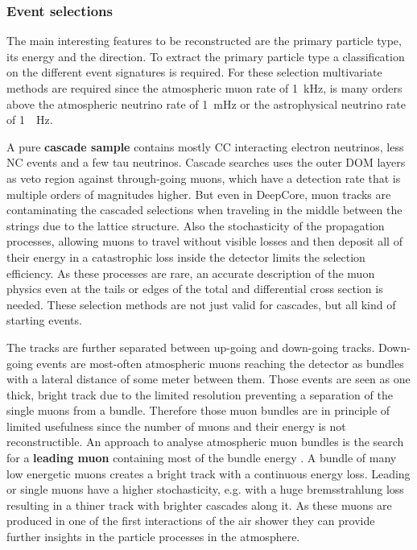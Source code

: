 \subsubsection{Event selections}

The main interesting features to be reconstructed are the primary particle type, its energy and the direction.
To extract the primary particle type a classification on the different event signatures is required.
For these selection multivariate methods are required since the atmospheric muon rate of \SI{1}{kHz}, is many orders above the atmospheric neutrino rate of \SI{1}{mHz} or the astrophysical neutrino rate of \SI{1}{\micro.Hz}.

A pure \textbf{cascade sample} contains mostly CC interacting electron neutrinos, less NC events and a few tau neutrinos.
Cascade searches \cite{IceCube20Cascades} uses the outer DOM layers as veto region against through-going muons, which have a detection rate that is multiple orders of magnitudes higher.
But even in DeepCore, muon tracks are contaminating the cascaded selections when traveling in the middle between the strings due to the lattice structure.
Also the stochasticity of the propagation processes, allowing muons to travel without visible losses and then deposit all of their energy in a catastrophic loss inside the detector limits the selection efficiency.
As these processes are rare, an accurate description of the muon physics even at the tails or edges of the total and differential cross section is needed.
These selection methods are not just valid for cascades, but all kind of starting events.

The tracks are further separated between up-going and down-going tracks.
Down-going events are most-often atmospheric muons reaching the detector as bundles with a lateral distance of some meter between them.
Those events are seen as one thick, bright track due to the limited resolution preventing a separation of the single muons from a bundle.
Therefore those muon bundles are in principle of limited usefulness since the number of muons and their energy is not reconstructible.
An approach to analyse atmospheric muon bundles is the search for a \textbf{leading muon} containing most of the bundle energy \cite{Fuchs16PhD}.
A bundle of many low energetic muons creates a bright track with a continuous energy loss.
Leading or single muons have a higher stochasticity, e.g. with a huge bremsstrahlung loss resulting in a thiner track with brighter cascades along it.
As these muons are produced in one of the first interactions of the air shower they can provide further insights in the particle processes in the atmosphere.

